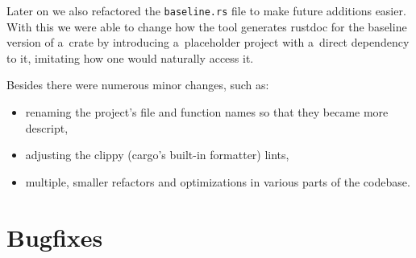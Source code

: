 \documentclass[licencjacka,en]{pracamgr}
\begin{document}
Later on we also refactored the \texttt{baseline.rs} file to make future additions easier.
With this we were able to change how the tool generates rustdoc for the baseline version of a~crate
by introducing a~placeholder project with a~direct dependency to it, imitating how one would
naturally access it.

Besides there were numerous minor changes, such as:
\begin{itemize}
	\item renaming the project's file and function names so that they became more descript,
	\item adjusting the clippy (cargo's built-in formatter) lints,
	\item multiple, smaller refactors and optimizations in various parts of the codebase.
\end{itemize}

\section{Bugfixes}\label{r:section_bugfixes}
\end{document}
